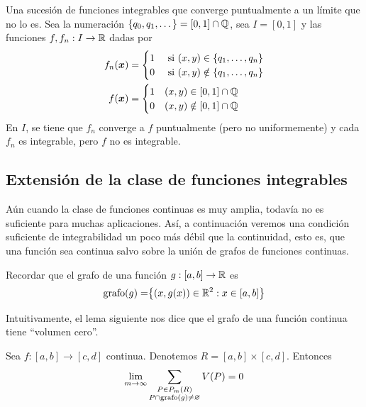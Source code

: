 \begin{ejemplo}
Una sucesi\'on de funciones integrables que converge puntualmente a un l\'imite que no lo es. Sea la numeraci\'on $ \{ q_0, q_1, \dotsc \} = [0, 1] \cap \mathbb{Q} $, sea $ I = [0,1] $ y las funciones $ f,f_n:I \to \mathbb{R} $ dadas por
\begin{align*}
f_n(\boldsymbol{x}) &=
    \begin{cases}
        1& \text{ si }(x,y) \in \{q_1, \dotsc, q_n\}\\
        0& \text{ si }(x,y) \notin \{q_1, \dotsc, q_n\}
    \end{cases} \\
f(\boldsymbol{x}) &=
    \begin{cases}
        1& (x,y) \in [0, 1] \cap \mathbb{Q} \\
        0& (x,y) \notin [0, 1] \cap \mathbb{Q}
    \end{cases}
\end{align*}
En $ I $, se tiene que $ f_n $ converge a $ f $ puntualmente (pero
no uniformemente) y cada $f_n$ es integrable, pero $ f $ no es
integrable.
\end{ejemplo}

\subsection{Extensi\'on de la clase de funciones integrables}

A\'un cuando la clase de funciones continuas es muy amplia, todav\'ia no es suficiente para muchas aplicaciones. As\'i, a continuaci\'on veremos una condici\'on suficiente de integrabilidad un poco m\'as d\'ebil que la continuidad, esto es, que una funci\'on sea continua salvo sobre la uni\'on de grafos de funciones continuas.

Recordar que el grafo de una funci\'on $ g: [a,b] \to \mathbb{R} $ es
\[ \operatorname{grafo}(g) = \bigr\{ (x,g(x)) \in \mathbb{R}^2 :  x \in [a,b]\bigr\} \]

Intuitivamente, el lema siguiente nos dice que el grafo de una funci\'on continua tiene ``volumen cero''.

\begin{lema}\label{lem:volumencero}
Sea  $ f: [a,b] \to [c,d] $ continua. Denotemos $ R = [a,b] \times
[c,d] $. Entonces
    \[ \lim_{m \to \infty} \sum_{\substack{P \in P_{m}(R) \\ P \cap
    \operatorname{grafo}(g) \neq \varnothing}} V(P) = 0 \]
\end{lema}

